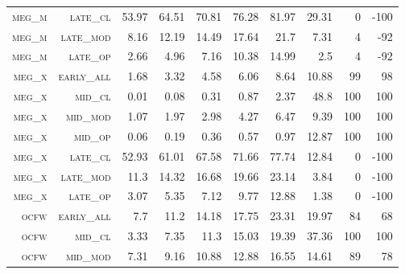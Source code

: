 \begin{landscape}
\begin{table}[!htbp]
\begin{tabular}{@{}rrrrrrr|rrr@{}}
 \textsc{meg\_m}      &  \textsc{late\_cl  }      &  53.97          &  64.51            &  70.81     &  76.28           &  81.97      &  29.31    &  0     &  -100      \\
 \textsc{meg\_m}      &  \textsc{late\_mod }      &  8.16           &  12.19            &  14.49     &  17.64           &  21.7       &  7.31     &  4     &  -92      \\
 \textsc{meg\_m}      &  \textsc{late\_op  }      &  2.66           &  4.96             &  7.16      &  10.38           &  14.99      &  2.5      &  4     &  -92      \\
 \textsc{meg\_x}      &  \textsc{early\_all}      &  1.68           &  3.32             &  4.58      &  6.06            &  8.64       &  10.88    &  99    &  98       \\
 \textsc{meg\_x}      &  \textsc{mid\_cl   }      &  0.01           &  0.08             &  0.31      &  0.87            &  2.37       &  48.8     &  100   &  100      \\
 \textsc{meg\_x}      &  \textsc{mid\_mod  }      &  1.07           &  1.97             &  2.98      &  4.27            &  6.47       &  9.39     &  100   &  100      \\
 \textsc{meg\_x}      &  \textsc{mid\_op   }      &  0.06           &  0.19             &  0.36      &  0.57            &  0.97       &  12.87    &  100   &  100      \\
 \textsc{meg\_x}      &  \textsc{late\_cl  }      &  52.93          &  61.01            &  67.58     &  71.66           &  77.74      &  12.84    &  0     &  -100      \\
 \textsc{meg\_x}      &  \textsc{late\_mod }      &  11.3           &  14.32            &  16.68     &  19.66           &  23.14      &  3.84     &  0     &  -100      \\
 \textsc{meg\_x}      &  \textsc{late\_op  }      &  3.07           &  5.35             &  7.12      &  9.77            &  12.88      &  1.38     &  0     &  -100      \\
 \textsc{ocfw}        &  \textsc{early\_all}      &  7.7            &  11.2             &  14.18     &  17.75           &  23.31      &  19.97    &  84    &  68      \\
 \textsc{ocfw}        &  \textsc{mid\_cl   }      &  3.33           &  7.35             &  11.3      &  15.03           &  19.39      &  37.36    &  100   &  100      \\
 \textsc{ocfw}        &  \textsc{mid\_mod  }      &  7.31           &  9.16             &  10.88     &  12.88           &  16.55      &  14.61    &  89    &  78      \\

\end{tabular}
\end{table}
\end{landscape}
